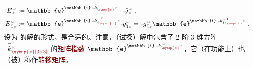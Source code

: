 \begin{subequations} \label{eq:matrix_exp}
\begin{align}
	\Xint{\mathcolor{gray}{-}}{30}{\bar{E}}^{\;\!\mathcolor{gray}{\omega}}_{\;\! \mathcolor{gray}{z}} &:= \mathbb{e}^{\mathbb{i} \Xint{\begin{smallmatrix} ~ \\ {}^{}_{\mathcolor{gray}{-}} \\ ~ \end{smallmatrix}}{15}{\bar{\bar{k}}}_{\textcolor{Maroon}{\symup{z}}}^{\;\! \mathcolor{gray}{\omega}} \mathcolor{gray}{z}} \cdot \Xint{{}^{}_{\mathcolor{gray}{-}}}{10}{\bar{g}}^{\;\!\mathcolor{gray}{\omega}}_{\;\! \mathcolor{gray}{z}} ~, \label{eq:vec-matrix_exp} \\
	\Xint{\mathcolor{gray}{-}}{30}{E}^{\;\!\mathcolor{gray}{\omega}}_{\;\! \hat{1} \mathcolor{gray}{z}} &:= \mathbb{e}^{\mathbb{i} \Xint{\begin{smallmatrix} ~ \\ {}^{}_{\mathcolor{gray}{-}} \\ ~ \end{smallmatrix}}{15}{k}_{\hat{1} \textcolor{Maroon}{\symup{z}}}^{\;\! \mathcolor{gray}{\omega} \breve{1}} \mathcolor{gray}{z}} \Xint{{}^{}_{\mathcolor{gray}{-}}}{10}{g}^{\;\!\mathcolor{gray}{\omega}}_{\;\! \breve{1} \mathcolor{gray}{z}} = \Xint{{}^{}_{\mathcolor{gray}{-}}}{10}{g}^{\;\!\mathcolor{gray}{\omega}}_{\;\! \breve{1} \mathcolor{gray}{z}} \mathbb{e}^{\mathbb{i} \Xint{\begin{smallmatrix} ~ \\ {}^{}_{\mathcolor{gray}{-}} \\ ~ \end{smallmatrix}}{15}{k}_{\hat{1} \textcolor{Maroon}{\symup{z}}}^{\;\! \mathcolor{gray}{\omega} \breve{1}} \mathcolor{gray}{z}} ~, \label{eq:components-matrix_exp}
\end{align}
\end{subequations}
设为  的解的形式，是合适的\cite{xieAnalytic3DVector}。注意，（试探）解中包含了 2 阶 3 维方阵 $\Xint{\begin{smallmatrix} ~ \\ {}^{}_{\mathcolor{gray}{-}} \\ ~ \end{smallmatrix}}{15}{\bar{\bar{k}}}_{\textcolor{Maroon}{\symup{z}\left[3 \times 3\right]}}^{\;\! \mathcolor{gray}{\omega}}$ 的\textcolor{Maroon}{矩阵指数} $\mathbb{e}^{\mathbb{i} \Xint{\begin{smallmatrix} ~ \\ {}^{}_{\mathcolor{gray}{-}} \\ ~ \end{smallmatrix}}{15}{\bar{\bar{k}}}_{\textcolor{Maroon}{\symup{z}}}^{\;\! \mathcolor{gray}{\omega}} \mathcolor{gray}{z}}$\cite{pessoaAvoidingMatrixExponentials2024,molerNineteenDubiousWays2003}，它（在功能上）也（被）称作\textcolor{Maroon}{转移矩阵}。

